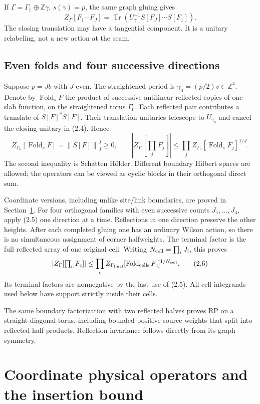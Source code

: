 \documentclass[11pt]{article}
\theoremstyle{remark}
\newcommand{\tr}{\operatorname{Tr}}
\newcommand{\norm}[1]{\left\|#1\right\|}
\newcommand{\Z}{\mathbb Z}
\begin{document}
If $\Gamma=\Gamma_\parallel\oplus\Z\gamma$,
$s(\gamma)=p$, the same graph gluing gives
\[
 Z_\Gamma[F_1\cdots F_J]
 =\tr(U_\gamma^{-1}S[F_J]\cdots S[F_1]).
 \tag{2.4}
\]
The closing translation may have a tangential component. It is a
unitary relabeling, not a new action at the seam.

\subsection{Even folds and four successive directions}
Suppose $p=Jb$ with $J$ even. The straightened period is
$\gamma_0=(p/2)v\in\Z^4$. Denote by $\operatorname{Fold}_sF$
the product of successive antilinear reflected copies of one slab
function, on the straightened torus $\Gamma_0$.
Each reflected pair contributes a translate of $S[F]^*S[F]$.
Their translation unitaries telescope to $U_{\gamma_0}$ and cancel
the closing unitary in (2.4). Hence
\[
 Z_{\Gamma_0}[\operatorname{Fold}_sF]=\norm{S[F]}_J^J\ge0,
 \qquad
 |Z_\Gamma[\textstyle\prod_jF_j]|
 \le\prod_j Z_{\Gamma_0}[\operatorname{Fold}_sF_j]^{1/J}.
 \tag{2.5}
\]
The second inequality is Schatten H\"older. Different boundary
Hilbert spaces are allowed; the operators can be viewed as cyclic
blocks in their orthogonal direct sum.

Coordinate versions, including unlike site/link boundaries, are
proved in Section~\ref{sec:coordinate}. For four orthogonal families
with even successive counts $J_1,\ldots,J_4$, apply (2.5) one direction
at a time. Reflections in one direction preserve the other heights.
After each completed gluing one has an ordinary Wilson action, so
there is no simultaneous assignment of corner halfweights. The
terminal factor is the full reflected array of one original cell.
Writing $N_{\rm cell}=\prod_iJ_i$, this proves
\[
 \left|Z_\Gamma[\textstyle\prod_cF_c]\right|
 \le\prod_c
 Z_{\Gamma_{\rm final}}[\operatorname{Fold}_{\rm cells}F_c]^{1/N_{\rm cell}}.
 \tag{2.6}
\]
Its terminal factors are nonnegative by the last use of (2.5).
All cell integrands used below have support strictly inside their cells.

The same boundary factorization with two reflected halves proves RP
on a straight diagonal torus, including bounded positive source
weights that split into reflected half products. Reflection invariance
follows directly from its graph symmetry.

\section{Coordinate physical operators and the insertion bound}
\label{sec:coordinate}
\end{document}
